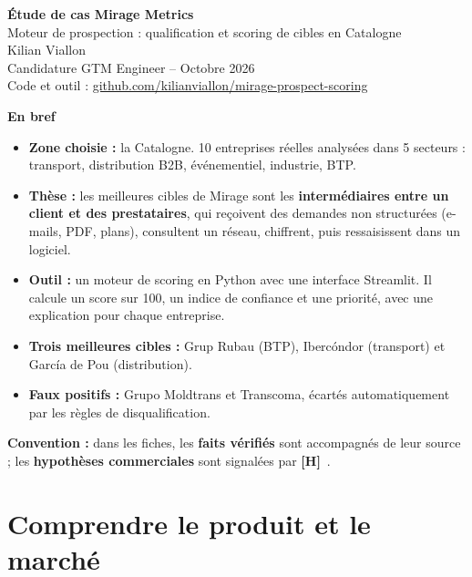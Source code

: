 \documentclass[11pt,a4paper]{article}
\newcommand{\hyp}{\textcolor{hypo}{\textbf{[H]}}~}
\begin{document}
\begin{center}
  {\Huge\bfseries\color{mirage} Étude de cas Mirage Metrics}\\[0.4em]
  {\Large Moteur de prospection : qualification et scoring de cibles en Catalogne}\\[1em]
  {\large Kilian Viallon}\\[0.2em]
  {\small Candidature GTM Engineer -- Octobre 2026}\\[0.4em]
  {\small Code et outil : \href{https://github.com/kilianviallon/mirage-prospect-scoring}{github.com/kilianviallon/mirage-prospect-scoring}}
\end{center}

\vspace{0.8em}

\begin{synthese}
\textbf{En bref}
\begin{itemize}
  \item \textbf{Zone choisie :} la Catalogne. 10 entreprises réelles analysées dans 5 secteurs : transport, distribution B2B, événementiel, industrie, BTP.
  \item \textbf{Thèse :} les meilleures cibles de Mirage sont les \textbf{intermédiaires entre un client et des prestataires}, qui reçoivent des demandes non structurées (e-mails, PDF, plans), consultent un réseau, chiffrent, puis ressaisissent dans un logiciel.
  \item \textbf{Outil :} un moteur de scoring en Python avec une interface Streamlit. Il calcule un score sur 100, un indice de confiance et une priorité, avec une explication pour chaque entreprise.
  \item \textbf{Trois meilleures cibles :} Grup Rubau (BTP), Ibercóndor (transport) et García de Pou (distribution).
  \item \textbf{Faux positifs :} Grupo Moldtrans et Transcoma, écartés automatiquement par les règles de disqualification.
\end{itemize}
\end{synthese}

\textbf{Convention :} dans les fiches, les \textbf{faits vérifiés} sont accompagnés de leur source ; les \textbf{hypothèses commerciales} sont signalées par \hyp.

\tableofcontents
\newpage

\section{Comprendre le produit et le marché}
\end{document}
